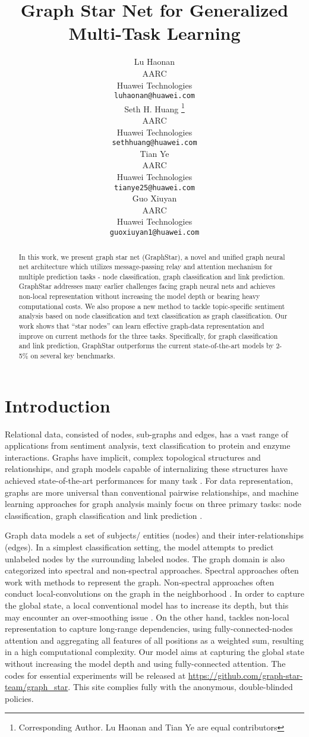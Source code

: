 \documentclass{article}
\title{Graph Star Net for Generalized Multi-Task Learning}
\author{Lu Haonan \\
  AARC\\
  Huawei Technologies\\
  \texttt{luhaonan@huawei.com} \\
\And
   Seth H. Huang
   \thanks{Corresponding Author.  Lu Haonan and Tian Ye are equal contributors}\\
   AARC \\
   Huawei Technologies \\
   \texttt{sethhuang@huawei.com} \\
   \AND
   Tian Ye \\
   AARC \\
   Huawei Technologies \\
   \texttt{tianye25@huawei.com} \\
   \And
   Guo Xiuyan \\
   AARC\\
   Huawei Technologies \\
  \texttt{guoxiuyan1@huawei.com} \\
}
\begin{document}
\maketitle
\begin{abstract}
In this work, we present graph star net (GraphStar), a novel and unified graph neural net architecture which utilizes message-passing relay and attention mechanism for multiple prediction tasks - node classification, graph classification and link prediction. GraphStar addresses many earlier challenges facing graph neural nets and achieves non-local representation without increasing the model depth or bearing heavy computational costs. We also propose a new method to tackle topic-specific sentiment analysis based on node classification and text classification as graph classification. Our work shows that “star nodes” can learn effective graph-data representation and improve on current methods for the three tasks. Specifically, for graph classification and link prediction, GraphStar outperforms the current state-of-the-art models by 2-5\% on several key benchmarks.
\end{abstract}

\section{Introduction}
Relational data, consisted of nodes, sub-graphs and edges, has a vast range of applications from sentiment analysis, text classification to protein and enzyme interactions. Graphs have implicit, complex topological structures and relationships, and graph models capable of internalizing these structures have achieved state-of-the-art performances for many task \cite{zhou2018graph}. For data representation, graphs are more universal than conventional pairwise relationships, and machine learning approaches for graph analysis mainly focus on three primary tasks: node classification, graph classification and link prediction \cite{monti2017geometric,perozzi2014deepwalk, tang2015line}. 

Graph data models a set of subjects/ entities (nodes) and their inter-relationships (edges). In a simplest classification setting, the model attempts to predict unlabeled nodes by the surrounding labeled nodes. The graph domain is also categorized into spectral and non-spectral approaches. Spectral approaches often work with methods to represent the graph. Non-spectral approaches often conduct local-convolutions on the graph in the neighborhood \cite{hamilton2017inductive,velivckovic2017graph}. In order to capture the global state, a local conventional model has to increase its depth, but this may encounter an over-smoothing issue \cite{zhou2018graph,gilmer2017neural,li2015gated}. On the other hand, \cite{wang2018non} tackles non-local representation to capture long-range dependencies, using fully-connected-nodes attention and aggregating all features of all positions as a weighted sum, resulting in a high computational complexity. Our model aims at capturing the global state without increasing the model depth and using fully-connected attention. The codes for essential experiments will be released at \url{ https://github.com/graph-star-team/graph_star}. This site complies fully with the anonymous, double-blinded policies.
\end{document}
